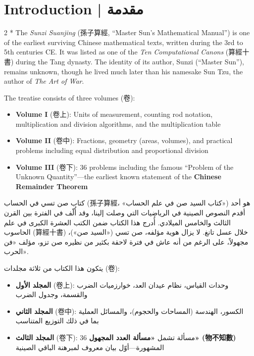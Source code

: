 \documentclass[11pt,a4paper]{article}
\newcommand{\ar}[1]{\arabicfont\beginR #1\endR}
\newcommand{\zh}[1]{{\CJKfamily{}#1}}
\begin{document}
\tableofcontents
\newpage

\section{Introduction | \ar{مقدمة}}

\begin{paracol}{2}
\switchcolumn[0]*\noindent
The \textit{Sunzi Suanjing} (\zh{孫子算經}, ``Master Sun's Mathematical Manual'') is one of the earliest surviving Chinese mathematical texts, written during the 3rd to 5th centuries CE. It was listed as one of the \textit{Ten Computational Canons} (\zh{算經十書}) during the Tang dynasty. The identity of its author, Sunzi (``Master Sun''), remains unknown, though he lived much later than his namesake Sun Tzu, the author of \textit{The Art of War}.

The treatise consists of three volumes (\zh{卷}):
\begin{itemize}[leftmargin=1.5em,itemsep=1pt]
  \item \textbf{Volume I} (\zh{卷上}): Units of measurement, counting rod notation, multiplication and division algorithms, and the multiplication table
  \item \textbf{Volume II} (\zh{卷中}): Fractions, geometry (areas, volumes), and practical problems including equal distribution and proportional division
  \item \textbf{Volume III} (\zh{卷下}): 36 problems including the famous ``Problem of the Unknown Quantity''---the earliest known statement of the \textbf{Chinese Remainder Theorem}
\end{itemize}

\switchcolumn
\noindent
\ar{كتاب صن تسي في الحساب (孫子算經، «كتاب السيد صن في علم الحساب») هو أحد أقدم النصوص الصينية في الرياضيات التي وصلت إلينا، وقد أُلّف في الفترة بين القرن الثالث والخامس الميلادي. أُدرج هذا الكتاب ضمن الكتب العشرة الكبرى في علم الحاسوب (算經十書) خلال عسل تانغ. لا يزال هوية مؤلفه، صن تسي («السيد صن»)، مجهولاً، على الرغم من أنه عاش في فترة لاحقة بكثير من نظيره صن تزو، مؤلف «فن الحرب».}

\ar{يتكون هذا الكتاب من ثلاثة مجلدات (卷):}
\begin{itemize}[leftmargin=1.5em,itemsep=1pt]
  \item \ar{\textbf{المجلد الأول} (卷上): وحدات القياس، نظام عيدان العد، خوارزميات الضرب والقسمة، وجدول الضرب}
  \item \ar{\textbf{المجلد الثاني} (卷中): الكسور، الهندسة (المساحات والحجوم)، والمسائل العملية بما في ذلك التوزيع المتناسب}
  \item \ar{\textbf{المجلد الثالث} (卷下): 36 مسألة تشمل \textbf{«مسألة العدد المجهول» (物不知數)} المشهورة—أوّل بيان معروف لمبرهنة الباقي الصينية}
\end{itemize}
\end{paracol}
\end{document}
